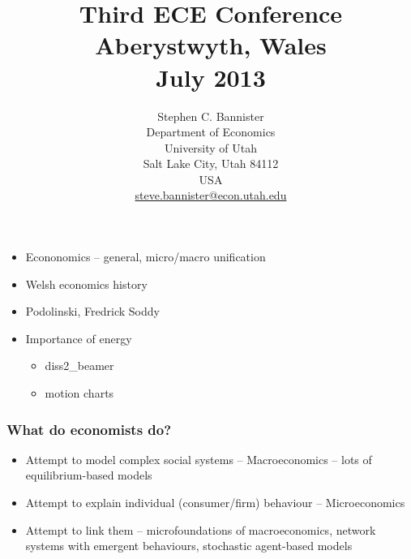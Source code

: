\documentclass[final]{beamer}
\title{Third ECE Conference\\Aberystwyth, Wales\\July 2013} %
\author{Stephen C. Bannister\\
	Department of Economics\\
	University of Utah\\
	Salt Lake City, Utah 84112\\
	USA\\
	\href{mailto:steve.bannister@econ.utah.edu}{steve.bannister@econ.utah.edu}\\
	}
\date{}
\begin{document}

	\maketitle
	\nocite{*}
%	

	
%	

\begin{frame}
\begin{itemize}
\item Econonomics -- general, micro/macro unification
\item Welsh economics history
\item Podolinski, Fredrick Soddy
\item Importance of energy
	\begin{itemize}
	\item diss2\_beamer
	\item motion charts
	\end{itemize}
\end{itemize}
\end{frame}

\begin{frame}
\frametitle{What do economists do?}
\begin{itemize}	
\item Attempt to model complex social systems -- Macroeconomics -- lots of equilibrium-based models
\item Attempt to explain individual (consumer/firm) behaviour -- Microeconomics
\item Attempt to link them -- microfoundations of macroeconomics, network systems with emergent behaviours, stochastic agent-based models
\end{itemize}
\end{frame}
\end{document}

